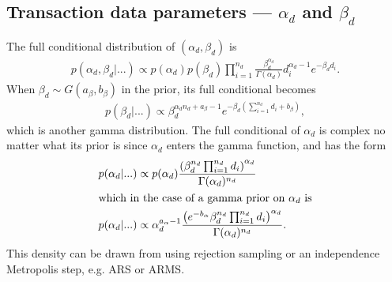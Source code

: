 \documentclass{article}
\begin{document}
\subsection{Transaction data parameters --- $\alpha_d$ and $\beta_d$}
The full conditional distribution of $(\alpha_d,\beta_d)$ is 
\begin{align*}
p(\alpha_d,\beta_d|...) \propto p(\alpha_d)p(\beta_d) \prod_{i=1}^{n_d}\frac{\beta_d^{\alpha_d}}{\Gamma(\alpha_d)}d_i^{\alpha_d - 1}e^{-\beta_dd_i}.
\end{align*}
When $\beta_d \sim G(a_\beta, b_\beta)$ in the prior, its full conditional becomes
\begin{align*}
p(\beta_d|...) \propto \beta_d^{\alpha_dn_d + a_{\beta} - 1}e^{-\beta_d\left(\sum_{i=1}^{n_d}d_i + b_{\beta}\right)},
\end{align*}
which is another gamma distribution. The full conditional of $\alpha_d$ is complex no matter what its prior is since $\alpha_d$ enters the gamma function, and has the form
\begin{align*}
p(\alpha_d|...) &\propto p(\alpha_d)\frac{\left(\beta_d^{n_d}\prod_{i=1}^{n_d}d_i\right)^{\alpha_d}}{\Gamma(\alpha_d)^{n_d}}\\
\intertext{which in the case of a gamma prior on $\alpha_d$ is}
p(\alpha_d|...) &\propto \alpha_d^{a_\alpha - 1}\frac{\left(e^{-b_\alpha}\beta_d^{n_d}\prod_{i=1}^{n_d}d_i\right)^{\alpha_d}}{\Gamma(\alpha_d)^{n_d}}.
\end{align*}
This density can be drawn from using rejection sampling or an independence Metropolis step, e.g. ARS or ARMS.
 

\end{document}
